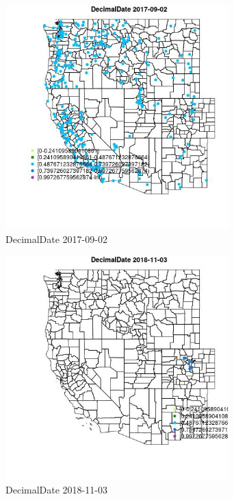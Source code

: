 \begin{figure} 
\centering  
\includegraphics[width=0.77\textwidth]{Code_Outputs/Report_ML_input_PM25_Step4_part_e_de_duplicated_aveswNAs_MapObsDecimalDate2017-09-02.jpg} 
\caption{\label{fig:Report_ML_input_PM25_Step4_part_e_de_duplicated_aveswNAsMapObsDecimalDate2017-09-02}DecimalDate 2017-09-02} 
\end{figure} 
 

\begin{figure} 
\centering  
\includegraphics[width=0.77\textwidth]{Code_Outputs/Report_ML_input_PM25_Step4_part_e_de_duplicated_aveswNAs_MapObsDecimalDate2018-11-03.jpg} 
\caption{\label{fig:Report_ML_input_PM25_Step4_part_e_de_duplicated_aveswNAsMapObsDecimalDate2018-11-03}DecimalDate 2018-11-03} 
\end{figure} 
 

